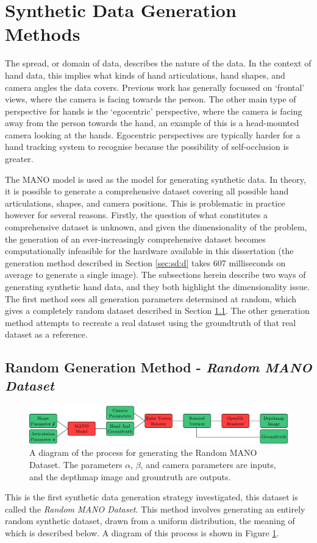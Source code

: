 \section{Synthetic Data Generation Methods}
\label{sec:sdgm}
The spread, or domain of data, describes the nature of the data. In the context of hand data, this implies what kinds of hand articulations, hand shapes, and camera angles the data covers. Previous work has generally focussed on `frontal' views, where the camera is facing towards the person. The other main type of perspective for hands is the `egocentric' perspective, where the camera is facing away from the person towards the hand, an example of this is a head-mounted camera looking at the hands. Egocentric perspectives are typically harder for a hand tracking system to recognise because the possibility of self-occlusion is greater.

The MANO model is used as the model for generating synthetic data. In theory, it is possible to generate a comprehensive dataset covering all possible hand articulations, shapes, and camera positions. This is problematic in practice however for several reasons. Firstly, the question of what constitutes a comprehensive dataset is unknown, and given the dimensionality of the problem, the generation of an ever-increasingly comprehensive dataset becomes computationally infeasible for the hardware available in this dissertation (the generation method described in Section \ref{sec:sd:d} takes 607 milliseconds on average to generate a single image). The subsections herein describe two ways of generating synthetic hand data, and they both highlight the dimensionality issue. The first method sees all generation parameters determined at random, which gives a completely random dataset described in Section \ref{sec:rgm}. The other generation method attempts to recreate a real dataset using the groundtruth of that real dataset as a reference.

\subsection{Random Generation Method - {\slshape Random MANO Dataset}}
\label{sec:rgm}
\begin{figure}
    \includegraphics[width=\linewidth]{figs/general/nd_process.pdf}
    \caption{A diagram of the process for generating the Random MANO Dataset. The parameters $\alpha$, $\beta$, and camera parameters are inputs, and the depthmap image and grountruth are outputs.}
    \label{fig:ndproc}
\end{figure}
This is the first synthetic data generation strategy investigated, this dataset is called the {\slshape Random MANO Dataset}. This method involves generating an entirely random synthetic dataset, drawn from a uniform distribution, the meaning of which is described below. A diagram of this process is shown in Figure \ref{fig:ndproc}.

